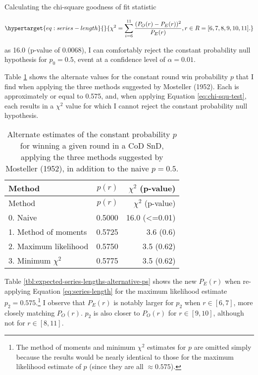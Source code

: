 \documentclass{article}
\begin{document}
Calculating the chi-square goodness of fit statistic

\begin{equation}\protect\hypertarget{eq:series-length}{}{
\chi^2 = \sum^{11}_{i=6} \frac{(P_O(r) - P_E(r))^2}{P_E(r)}, r \in R = [6, 7, 8, 9, 10, 11].
}\label{eq:chi-squ-test}\end{equation}

as 16.0 (p-value of 0.0068), I can comfortably reject the constant
probability null hypothesis for \(p_0 = 0.5\), event at a confidence
level of \(\alpha = 0.01\).

Table \ref{tbl:mosteller-methods-results} shows the alternate values for
the constant round win probability \(p\) that I find when applying the
three methods suggested by Mosteller (1952). Each is approximately or
equal to 0.575, and, when applying Equation \ref{eq:chi-squ-test}, each
results in a \(\chi^2\) value for which I cannot reject the constant
probability null hypothesis.

\begin{longtable}[]{@{}lrr@{}}
\caption{Alternate estimates of the constant probability \(p\) for winning a given round in a CoD SnD, applying the three methods suggested by Mosteller (1952), in addition to the naive \(p = 0.5\).}\label{tbl:mosteller-methods-results} \\
\toprule()
Method & \(p(r)\) & \(\chi^2\) (p-value) \\
\midrule()
\endfirsthead
\toprule()
Method & \(p(r)\) & \(\chi^2\) (p-value) \\
\midrule()
\endhead
0. Naive & 0.5000 & 16.0 (\textless=0.01) \\
1. Method of moments & 0.5725 & 3.6 (0.6) \\
2. Maximum likelihood & 0.5750 & 3.5 (0.62) \\
3. Minimum \(\chi^2\) & 0.5775 & 3.5 (0.62) \\
\bottomrule()
\end{longtable}

Table \ref{tbl:expected-series-lengths-alternative-ps} shows the new
\(P_E(r)\) when re-applying Equation \ref{eq:series-length} for the
maximum likelihood estimate \(p_2 = 0.575\).\footnote{The method of
  moments and minimum \(\chi^2\) estimates for \(p\) are omitted simply
  because the results would be nearly identical to those for the maximum
  likelihood estimate of \(p\) (since they are all \(\approx 0.575\)).}
I observe that \(P_E(r)\) is notably larger for \(p_{2}\) when
\(r \in [6, 7]\), more closely matching \(P_O(r)\). \(p_{2}\) is also
closer to \(P_O(r)\) for \(r \in [9, 10]\), although not for
\(r \in [8, 11]\).
\end{document}
